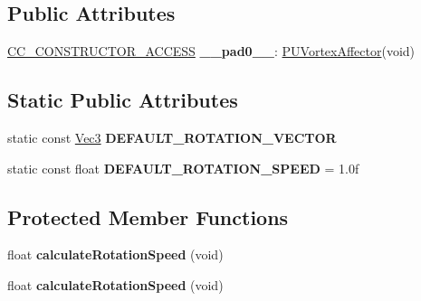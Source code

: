 \subsection*{Public Attributes}
\begin{DoxyCompactItemize}
\item 
\mbox{\label{classPUVortexAffector_ab9afdc885727349747e178d7dfe6e5c0}} 
\hyperlink{_2cocos2d_2cocos_2base_2ccConfig_8h_a25ef1314f97c35a2ed3d029b0ead6da0}{C\+C\+\_\+\+C\+O\+N\+S\+T\+R\+U\+C\+T\+O\+R\+\_\+\+A\+C\+C\+E\+SS} {\bfseries \+\_\+\+\_\+pad0\+\_\+\+\_\+}\+: \hyperlink{classPUVortexAffector}{P\+U\+Vortex\+Affector}(void)
\end{DoxyCompactItemize}
\subsection*{Static Public Attributes}
\begin{DoxyCompactItemize}
\item 
\mbox{\label{classPUVortexAffector_a67b1029711c7366b80ff286a8f82782d}} 
static const \hyperlink{classVec3}{Vec3} {\bfseries D\+E\+F\+A\+U\+L\+T\+\_\+\+R\+O\+T\+A\+T\+I\+O\+N\+\_\+\+V\+E\+C\+T\+OR}
\item 
\mbox{\label{classPUVortexAffector_ae5551c141c316ee4f7b3d118ebd29e5e}} 
static const float {\bfseries D\+E\+F\+A\+U\+L\+T\+\_\+\+R\+O\+T\+A\+T\+I\+O\+N\+\_\+\+S\+P\+E\+ED} = 1.\+0f
\end{DoxyCompactItemize}
\subsection*{Protected Member Functions}
\begin{DoxyCompactItemize}
\item 
\mbox{\label{classPUVortexAffector_ad8f3f762ab3a72e6f211a7d79e0eac6e}} 
float {\bfseries calculate\+Rotation\+Speed} (void)
\item 
\mbox{\label{classPUVortexAffector_ad8f3f762ab3a72e6f211a7d79e0eac6e}} 
float {\bfseries calculate\+Rotation\+Speed} (void)
\end{DoxyCompactItemize}
